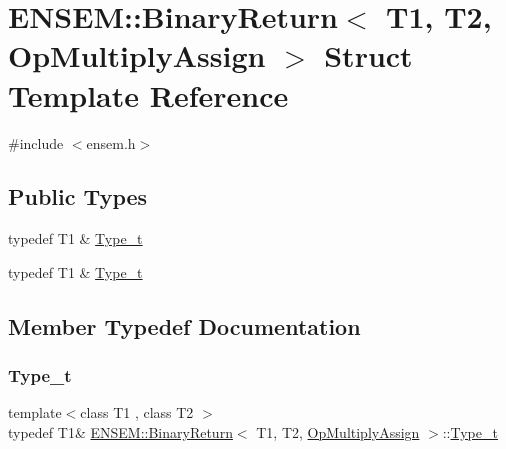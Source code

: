 \hypertarget{structENSEM_1_1BinaryReturn_3_01T1_00_01T2_00_01OpMultiplyAssign_01_4}{}\section{E\+N\+S\+EM\+:\+:Binary\+Return$<$ T1, T2, Op\+Multiply\+Assign $>$ Struct Template Reference}
\label{structENSEM_1_1BinaryReturn_3_01T1_00_01T2_00_01OpMultiplyAssign_01_4}


{\ttfamily \#include $<$ensem.\+h$>$}

\subsection*{Public Types}
\begin{DoxyCompactItemize}
\item 
typedef T1 \& \mbox{\hyperlink{structENSEM_1_1BinaryReturn_3_01T1_00_01T2_00_01OpMultiplyAssign_01_4_adc30f204bdf8c74d41a342332a239687}{Type\+\_\+t}}
\item 
typedef T1 \& \mbox{\hyperlink{structENSEM_1_1BinaryReturn_3_01T1_00_01T2_00_01OpMultiplyAssign_01_4_adc30f204bdf8c74d41a342332a239687}{Type\+\_\+t}}
\end{DoxyCompactItemize}


\subsection{Member Typedef Documentation}
\mbox{\label{structENSEM_1_1BinaryReturn_3_01T1_00_01T2_00_01OpMultiplyAssign_01_4_adc30f204bdf8c74d41a342332a239687}} 
\subsubsection{\texorpdfstring{Type\_t}{Type\_t}\hspace{0.1cm}{\footnotesize\ttfamily [1/2]}}
{\footnotesize\ttfamily template$<$class T1 , class T2 $>$ \\
typedef T1\& \mbox{\hyperlink{structENSEM_1_1BinaryReturn}{E\+N\+S\+E\+M\+::\+Binary\+Return}}$<$ T1, T2, \mbox{\hyperlink{structENSEM_1_1OpMultiplyAssign}{Op\+Multiply\+Assign}} $>$\+::\mbox{\hyperlink{structENSEM_1_1BinaryReturn_3_01T1_00_01T2_00_01OpMultiplyAssign_01_4_adc30f204bdf8c74d41a342332a239687}{Type\+\_\+t}}}

